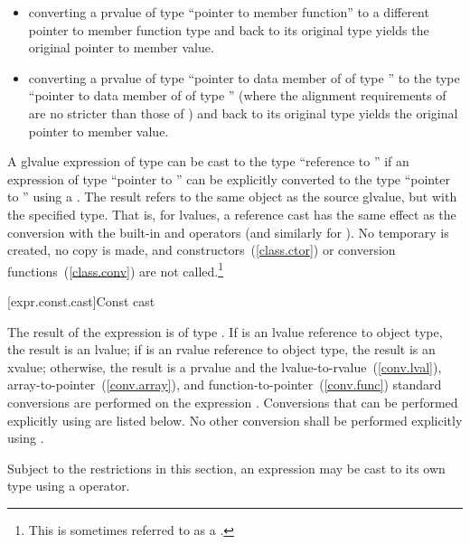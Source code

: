 \begin{itemize}
\item converting a prvalue of type ``pointer to member function'' to a
different pointer to member function type and back to its original type
yields the original pointer to member value.

\item converting a prvalue of type ``pointer to data member of 
of type '' to the type ``pointer to data member of 
of type '' (where the alignment requirements of  are
no stricter than those of ) and back to its original type
yields the original pointer to member value.
\end{itemize}

\pnum
{}%
%
A glvalue expression of type  can be cast to the type
``reference to '' if an expression of type ``pointer to
'' can be explicitly converted to the type ``pointer to
'' using a . The result refers to
the same object as the source glvalue, but with the specified
type. \enternote That is, for lvalues, a reference cast
 has the same effect as the conversion
 with the built-in \tcode{\&} and
\tcode{*} operators (and similarly for
). \exitnote No
temporary is created, no copy is made, and
constructors~(\ref{class.ctor}) or conversion
functions~(\ref{class.conv}) are not called.\footnote{This
is sometimes referred to as a .}

[expr.const.cast]{Const cast}

\pnum
{}%
%
The result of the expression  is of type
. If  is an lvalue reference to object type, the result is an
lvalue;
if  is an rvalue reference to object type, the result is an xvalue;
otherwise, the result is a prvalue and the
lvalue-to-rvalue~(\ref{conv.lval}), array-to-pointer~(\ref{conv.array}),
and function-to-pointer~(\ref{conv.func}) standard conversions are
performed on the expression . Conversions that can be performed explicitly using
 are listed below. No other conversion shall be
performed explicitly using .

\pnum
\enternote 
Subject to the restrictions in this section, an expression may be cast
to its own type using a  operator.
\exitnote 

